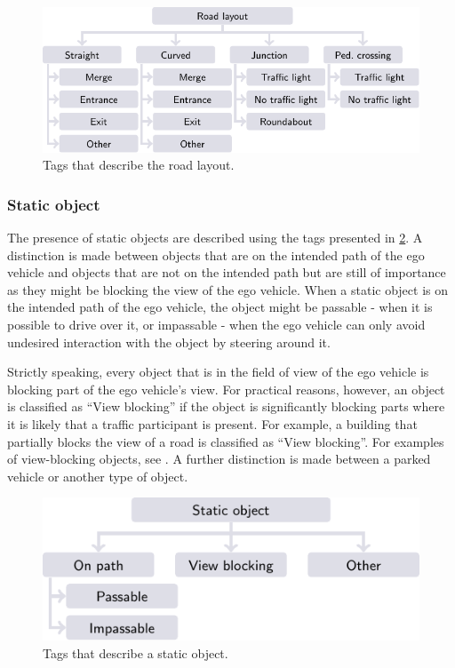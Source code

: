 \begin{figure}[t]
	\centering
	\includegraphics{figures/road_layout}
	\caption{Tags that describe the road layout.}
	\label{fig:tree road layout}
\end{figure}



\subsubsection{Static object}
\label{sec:static object}

The presence of static objects are described using the tags presented in \cref{fig:tree static object}. A distinction is made between objects that are on the intended path of the ego vehicle and objects that are not on the intended path but are still of importance as they might be blocking the view of the ego vehicle. When a static object is on the intended path of the ego vehicle, the object might be passable - when it is possible to drive over it, or impassable - when the ego vehicle can only avoid undesired interaction with the object by steering around it.

Strictly speaking, every object that is in the field of view of the ego vehicle is blocking part of the ego vehicle's view. For practical reasons, however, an object is classified as ``View blocking'' if the object is significantly blocking parts where it is likely that a traffic participant is present. For example, a building that partially blocks the view of a road is classified as ``View blocking''. For examples of view-blocking objects, see \cite{CATS2015}. A further distinction is made between a parked vehicle or another type of object.

\begin{figure}
	\centering
	\includegraphics{figures/static_object}
	\caption{Tags that describe a static object.}
	\label{fig:tree static object}
\end{figure}

